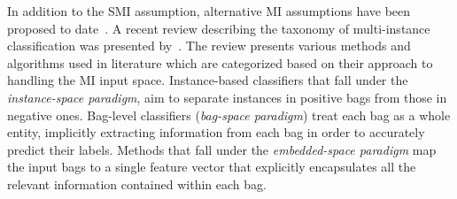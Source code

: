 In addition to the SMI assumption, alternative MI assumptions have been proposed to date~\citep{Foulds2010}. A recent review describing the taxonomy of multi-instance classification was presented by~\cite{Amores2013}. The review presents various methods and algorithms used in literature which are categorized based on their approach to handling the MI input space. Instance-based classifiers that fall under the \textit{instance-space paradigm}, aim to separate instances in positive bags from those in negative ones. Bag-level classifiers (\textit{bag-space paradigm}) treat each bag as a whole entity, implicitly extracting information from each bag in order to accurately predict their labels. Methods that fall under the \textit{embedded-space paradigm} map the input bags to a single feature vector that explicitly encapsulates all the relevant information contained within each bag.


